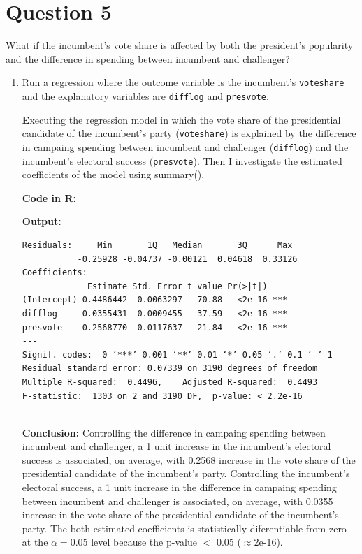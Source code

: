 \documentclass[12pt,letterpaper]{article}
\begin{document}
\section*{Question 5}
\noindent What if the incumbent's vote share is affected by both the president's popularity and the difference in spending between incumbent and challenger? 
	\begin{enumerate}
		\item Run a regression where the outcome variable is the incumbent's \texttt{voteshare} and the explanatory variables are \texttt{difflog} and \texttt{presvote}.	\vspace{0.5cm}
		
		\noindent \textbf Executing the regression model in which the vote share of the presidential candidate of the incumbent's party (\texttt{voteshare}) is explained by the difference in campaing spending between incumbent and challenger (\texttt{difflog}) and the incumbent's electoral success (\texttt{presvote}). Then I investigate the estimated coefficients of the model using summary(). \vspace{0.5cm}
		
		\noindent \textbf{Code in R:}
		  
		\vspace{.25cm}
		
		\noindent \textbf{Output: }
				\begin{footnotesize}
		\begin{verbatim}
Residuals:     Min       1Q   Median       3Q      Max 
           -0.25928 -0.04737 -0.00121  0.04618  0.33126 
Coefficients:             
             Estimate Std. Error t value Pr(>|t|)    
(Intercept) 0.4486442  0.0063297   70.88   <2e-16 ***
difflog     0.0355431  0.0009455   37.59   <2e-16 ***
presvote    0.2568770  0.0117637   21.84   <2e-16 ***
---
Signif. codes:  0 ‘***’ 0.001 ‘**’ 0.01 ‘*’ 0.05 ‘.’ 0.1 ‘ ’ 1
Residual standard error: 0.07339 on 3190 degrees of freedom
Multiple R-squared:  0.4496,	Adjusted R-squared:  0.4493 
F-statistic:  1303 on 2 and 3190 DF,  p-value: < 2.2e-16
			
		\end{verbatim}  
			\end{footnotesize}
		\vspace{.25cm}
		
		\noindent \textbf{Conclusion:} Controlling the difference in campaing spending between incumbent and challenger, a 1 unit increase in the incumbent's electoral success is associated, on average, with 0.2568 increase in the vote share of the presidential candidate of the incumbent's party. 
		Controlling the incumbent's electoral success, a 1 unit increase in the difference in campaing spending between incumbent and challenger is associated, on average, with 0.0355 increase in the vote share of the presidential candidate of the incumbent's party.  The both estimated coefficients is statistically diferentiable from zero at the  $\alpha=0.05$ level because the p-value $<$ 0.05 ($\approx $2e-16).
		\vspace{1 cm}
		

\end{enumerate}
\end{document}
